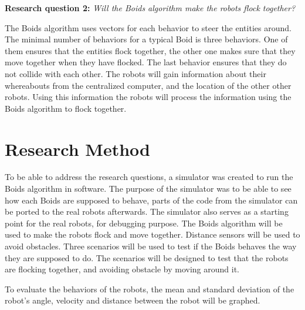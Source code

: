 \textbf{Research question 2:} {\it Will the Boids algorithm make the robots flock together?}

The Boids algorithm uses vectors for each behavior to steer the entities around. The minimal number of behaviors for a typical Boid is three behaviors. One of them ensures that the entities flock together, the other one makes sure that they move together when they have flocked. The last behavior ensures that they do not collide with each other. The robots will gain information about their whereabouts from the centralized computer, and the location of the other other robots. Using this information the robots will process the information using the Boids algorithm to flock together.


\section{Research Method}
\label{sec:researchMethod}
To be able to address the research questions, a simulator was created to run the Boids algorithm in software. The purpose of the simulator was to be able to see how each Boids are supposed to behave, parts of the code from the simulator can be ported to the real robots afterwards. The simulator also serves as a starting point for the real robots, for debugging purpose.
The Boids algorithm will be used to make the robots flock and move together. Distance sensors will be used to avoid obstacles.
Three scenarios will be used to test if the Boids behaves the way they are supposed to do. The scenarios will be designed to test that the robots are flocking together, and avoiding obstacle by moving around it.

To evaluate the behaviors of the robots, the mean and standard deviation of the robot's angle, velocity and distance between the robot will be graphed. 


